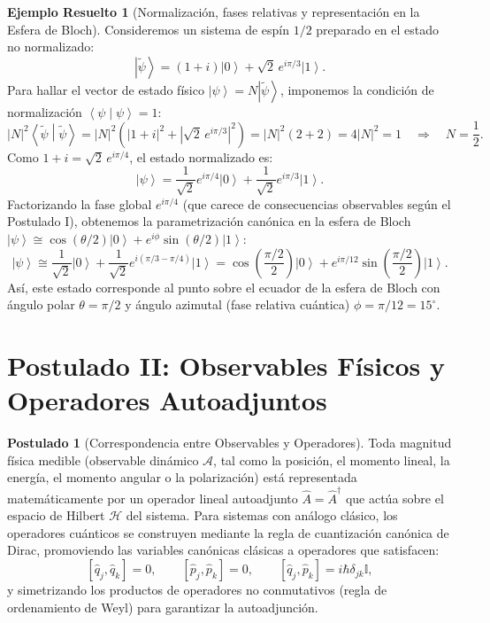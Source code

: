 \documentclass[11pt,a4paper,twoside]{report}
\theoremstyle{definition}
\newtheorem{postulado}{Postulado}[chapter]
\newtheorem{ejemplo}{Ejemplo Resuelto}[chapter]
\theoremstyle{plain}
\theoremstyle{remark}
\newcommand{\ket}[1]{\left| #1 \right\rangle}
\newcommand{\braket}[2]{\left\langle #1 \middle| #2 \right\rangle}
\newcommand{\comm}[2]{\left[ #1, #2 \right]}
\newcommand{\Hil}{\mathcal{H}}
\newcommand{\op}[1]{\hat{#1}}
\newcommand{\ident}{\hat{\mathbb{I}}}
\begin{document}
\begin{ejemplo}[Normalización, fases relativas y representación en la Esfera de Bloch]
Consideremos un sistema de espín $1/2$ preparado en el estado no normalizado:
\begin{equation}
    \ket{\tilde{\psi}} = (1 + i)\ket{0} + \sqrt{2}\,e^{i\pi/3}\ket{1}.
\end{equation}
Para hallar el vector de estado físico $\ket{\psi} = N\ket{\tilde{\psi}}$, imponemos la condición de normalización $\braket{\psi}{\psi} = 1$:
\begin{equation}
    |N|^2 \braket{\tilde{\psi}}{\tilde{\psi}} = |N|^2 \left( |1+i|^2 + |\sqrt{2}\,e^{i\pi/3}|^2 \right) = |N|^2 (2 + 2) = 4|N|^2 = 1 \quad \Longrightarrow \quad N = \frac{1}{2}.
\end{equation}
Como $1 + i = \sqrt{2}\,e^{i\pi/4}$, el estado normalizado es:
\begin{equation}
    \ket{\psi} = \frac{1}{\sqrt{2}}e^{i\pi/4}\ket{0} + \frac{1}{\sqrt{2}}e^{i\pi/3}\ket{1}.
\end{equation}
Factorizando la fase global $e^{i\pi/4}$ (que carece de consecuencias observables según el Postulado I), obtenemos la parametrización canónica en la esfera de Bloch $\ket{\psi} \cong \cos(\theta/2)\ket{0} + e^{i\phi}\sin(\theta/2)\ket{1}$:
\begin{equation}
    \ket{\psi} \cong \frac{1}{\sqrt{2}}\ket{0} + \frac{1}{\sqrt{2}}e^{i(\pi/3 - \pi/4)}\ket{1} = \cos\left(\frac{\pi/2}{2}\right)\ket{0} + e^{i\pi/12}\sin\left(\frac{\pi/2}{2}\right)\ket{1}.
\end{equation}
Así, este estado corresponde al punto sobre el ecuador de la esfera de Bloch con ángulo polar $\theta = \pi/2$ y ángulo azimutal (fase relativa cuántica) $\phi = \pi/12 = 15^\circ$.
\end{ejemplo}

\section{Postulado II: Observables Físicos y Operadores Autoadjuntos}

\begin{postulado}[Correspondencia entre Observables y Operadores]
Toda magnitud física medible (observable dinámico $\mathcal{A}$, tal como la posición, el momento lineal, la energía, el momento angular o la polarización) está representada matemáticamente por un operador lineal autoadjunto $\op{A} = \op{A}^\dagger$ que actúa sobre el espacio de Hilbert $\Hil$ del sistema. Para sistemas con análogo clásico, los operadores cuánticos se construyen mediante la regla de cuantización canónica de Dirac, promoviendo las variables canónicas clásicas a operadores que satisfacen:
\begin{equation}
    \comm{\op{q}_j}{\op{q}_k} = 0, \qquad \comm{\op{p}_j}{\op{p}_k} = 0, \qquad \comm{\op{q}_j}{\op{p}_k} = i\hbar \delta_{jk}\ident,
\end{equation}
y simetrizando los productos de operadores no conmutativos (regla de ordenamiento de Weyl) para garantizar la autoadjunción.
\end{postulado}
\end{document}
